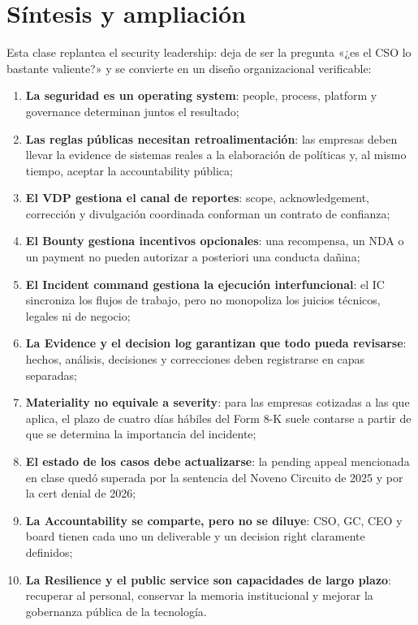 \section{Síntesis y ampliación}

Esta clase replantea el security leadership: deja de ser la pregunta «¿es el CSO lo bastante valiente?» y se convierte en un diseño organizacional verificable:

\begin{enumerate}
  \item \textbf{La seguridad es un operating system}: people, process, platform y governance determinan juntos el resultado;
  \item \textbf{Las reglas públicas necesitan retroalimentación}: las empresas deben llevar la evidence de sistemas reales a la elaboración de políticas y, al mismo tiempo, aceptar la accountability pública;
  \item \textbf{El VDP gestiona el canal de reportes}: scope, acknowledgement, corrección y divulgación coordinada conforman un contrato de confianza;
  \item \textbf{El Bounty gestiona incentivos opcionales}: una recompensa, un NDA o un payment no pueden autorizar a posteriori una conducta dañina;
  \item \textbf{El Incident command gestiona la ejecución interfuncional}: el IC sincroniza los flujos de trabajo, pero no monopoliza los juicios técnicos, legales ni de negocio;
  \item \textbf{La Evidence y el decision log garantizan que todo pueda revisarse}: hechos, análisis, decisiones y correcciones deben registrarse en capas separadas;
  \item \textbf{Materiality no equivale a severity}: para las empresas cotizadas a las que aplica, el plazo de cuatro días hábiles del Form 8-K suele contarse a partir de que se determina la importancia del incidente;
  \item \textbf{El estado de los casos debe actualizarse}: la pending appeal mencionada en clase quedó superada por la sentencia del Noveno Circuito de 2025 y por la cert denial de 2026;
  \item \textbf{La Accountability se comparte, pero no se diluye}: CSO, GC, CEO y board tienen cada uno un deliverable y un decision right claramente definidos;
  \item \textbf{La Resilience y el public service son capacidades de largo plazo}: recuperar al personal, conservar la memoria institucional y mejorar la gobernanza pública de la tecnología.
\end{enumerate}

